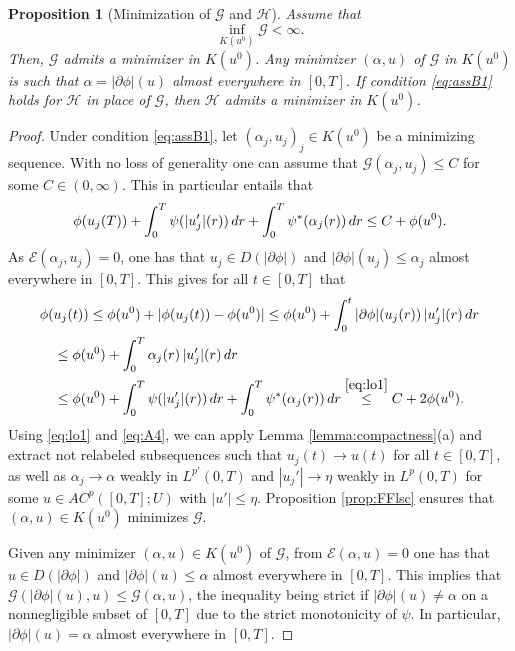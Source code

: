 \documentclass[10pt,a4paper]{amsart}
\newcommand{\dr}{{\rm d} r}
\renewcommand{\sl}{|\partial \phi|}
\newcommand{\GG}{{\mathcal G}}
\newcommand{\EE}{{\mathcal E}}
\newcommand{\HH}{{\mathcal H}}
\newtheorem{proposition}[theorem]{Proposition}
\begin{document}
\begin{proposition}[Minimization of $\GG$ and
  $\HH$] \label{prop:min}  Assume that
  \begin{equation}\label{eq:assB1}
    \inf_{K(u^0)}\GG <\infty.
\end{equation}
Then, $\GG$ admits a minimizer in $K(u^0)$. Any
minimizer $(\alpha,u)$ of $\GG$  in $K(u^0)$
 is such that $\alpha = \sl (u)$ almost everywhere in
 $[0,T]$.
 If condition \eqref{eq:assB1} holds for $\HH$ in place of $\GG$, then $\HH$ admits a minimizer in $K(u^0)$.
\end{proposition}
\begin{proof}
Under
condition \eqref{eq:assB1}, let $(\alpha_j,u_j)_j\in K(u^0)$ be a minimizing sequence. With no loss of generality one can assume that $
\GG(\alpha_j , u_j) \leq  C$  for some  $C \in (0, \infty)$.  This in
particular entails that
\begin{equation}
  \phi(u_j(T)) +  \int_0^T \psi(|u_j'| (r))\, \dr +  \int_0^T
\psi^*(\alpha_j(r))\, \dr \leq  C  +
\phi(u^0). \label{eq:lo1}
  \end{equation}
As $\EE(\alpha_j,u_j)=0$, one has that $u_j \in D(\sl)$ and $\sl (u_j) \leq \alpha_j$
almost everywhere in $[0,T]$. This gives
  for all $t \in [0,T] $ that
  \begin{align*}
    &\phi(u_j(t)) \leq \phi(u^0) + |\phi(u_j(t)) - \phi(u^0)| \leq \phi(u^0) + 
      \int_0^t \sl(u_j(r))\, |u_j'|(r)\, \dr \\
      &\quad\leq \phi(u^0) +  \int_0^T \alpha_j(r)\, |u_j'|(r)\,
      \dr \\
    &\quad \leq \phi(u^0) + \int_0^T \psi(|u_j'|(r))\,\dr + 
      \int_0^T \psi^*(\alpha_j(r))\, \dr \stackrel{\eqref{eq:lo1}}{\leq}
       C   + 2\phi(u^0).
  \end{align*}
   Using \eqref{eq:lo1} and \eqref{eq:A4}, we can apply Lemma \ref{lemma:compactness}(a)  and extract not relabeled
 subsequences such that $u_j (t) \to u(t)$ for
all $t \in [0,T]$, as well as  $\alpha_j \to \alpha$ weakly in
$L^{p'}(0,T)$ and $|u_j'|\to \eta$ weakly in $L^p(0,T)$  for some $u \in AC^p([0,T];U)$ with $|u'| \le \eta$.  Proposition \ref{prop:FFlsc} ensures that
$(\alpha,u)\in K(u^0)$ minimizes $\GG $.
  
  Given any minimizer $(\alpha,u)\in K(u^0)$ of $\GG$, from
  $\EE(\alpha,u)=0$ one has that $u \in D(\sl)$ and $\sl
  (u)\leq \alpha$ almost everywhere in $[0,T]$. This implies that
  $\GG (\sl(u),u) \leq \GG(\alpha,u)$, the inequality being
  strict if $\sl(u)\not =\alpha$ on a nonnegligible subset of $[0,T]$
   due to the strict monotonicity of $\psi$.   In
  particular, $ \sl(u)=\alpha$ almost everywhere in $[0,T]$.


\end{proof}
\end{document}
